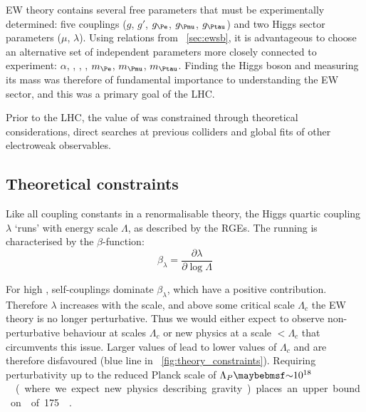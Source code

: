 
\ac{EW} theory contains several free parameters that must be experimentally 
determined: five couplings ($g$, $g'$, $g_{\Pe}$, $g_{\Pmu}$, $g_{\Ptau}$) and two 
Higgs sector parameters ($\mu$, $\lambda$). Using relations from \Section~\ref{sec:ewsb},
it is advantageous to choose an alternative set of independent parameters more closely
connected to experiment: $\alpha$, \mW, \mZ, \mH, $m_{\Pe}$, $m_{\Pmu}$, $m_{\Ptau}$.
Finding the Higgs boson and measuring its mass was therefore of fundamental importance to 
understanding the \ac{EW} sector, and this was a primary goal of the \ac{LHC}. 

Prior to the \ac{LHC}, the value of \mH was constrained through theoretical 
considerations, direct searches at previous colliders and global fits of other 
electroweak observables.



\subsection{Theoretical constraints}
\label{sec:prior_constraints:theory}

Like all coupling constants in a renormalisable theory, the Higgs quartic coupling 
$\lambda$ `runs' with energy scale $\Lambda$, as described by the \acp{RGE}. The running 
is characterised by the $\beta$-function:
\begin{equation*}
	\beta_{\lambda} = \frac{\partial \lambda}{\partial \log\Lambda}
\end{equation*}

For high \mH, self-couplings dominate $\beta_{\lambda}$, which have a
positive contribution. Therefore $\lambda$ increases with the scale, and above some 
critical scale $\Lambda_c$ the \ac{EW} theory is no longer perturbative. Thus we would 
either expect to observe non-perturbative behaviour at scales \about$\Lambda_c$ or new 
physics at a scale $<\Lambda_c$ that circumvents this issue. Larger values of \mH lead to 
lower values of $\Lambda_c$ and are therefore disfavoured (blue line in 
\Figure~\ref{fig:theory_constraints}). Requiring perturbativity up to the 
reduced Planck scale of \unit{$\Lambda_{P} \about 10^{18}$}{\GeV} (where we expect new 
physics describing gravity) places an upper bound on \mH of \unit{175}{\GeV} 
\cite{Ellis:2009}.

